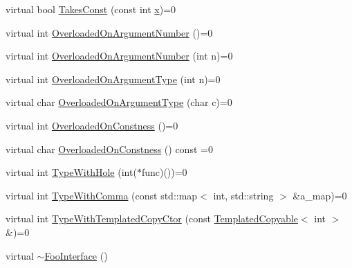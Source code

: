 \begin{DoxyCompactItemize}
\item 
virtual bool \mbox{\hyperlink{classtesting_1_1gmock__function__mocker__test_1_1_foo_interface_abb43737fd2eeb7599b6f0af540890f50}{Takes\+Const}} (const int \mbox{\hyperlink{_obj__test_2lib_2googletest-master_2googlemock_2test_2gmock-matchers__test_8cc_a6150e0515f7202e2fb518f7206ed97dc}{x}})=0
\item 
virtual int \mbox{\hyperlink{classtesting_1_1gmock__function__mocker__test_1_1_foo_interface_ae27d00da9698493b196d0913dd5b6c1a}{Overloaded\+On\+Argument\+Number}} ()=0
\item 
virtual int \mbox{\hyperlink{classtesting_1_1gmock__function__mocker__test_1_1_foo_interface_abc3dde10866e94084cdf5b3b412d2274}{Overloaded\+On\+Argument\+Number}} (int n)=0
\item 
virtual int \mbox{\hyperlink{classtesting_1_1gmock__function__mocker__test_1_1_foo_interface_a78fc84ae56ba53a36047f0791d03fc58}{Overloaded\+On\+Argument\+Type}} (int n)=0
\item 
virtual char \mbox{\hyperlink{classtesting_1_1gmock__function__mocker__test_1_1_foo_interface_ae45c3906c2196a0978720b91c521f91f}{Overloaded\+On\+Argument\+Type}} (char c)=0
\item 
virtual int \mbox{\hyperlink{classtesting_1_1gmock__function__mocker__test_1_1_foo_interface_a94e43dbddc176d1702a7a7d7281f2642}{Overloaded\+On\+Constness}} ()=0
\item 
virtual char \mbox{\hyperlink{classtesting_1_1gmock__function__mocker__test_1_1_foo_interface_a9014d2f6527f719b718b0915b27ff5c5}{Overloaded\+On\+Constness}} () const =0
\item 
virtual int \mbox{\hyperlink{classtesting_1_1gmock__function__mocker__test_1_1_foo_interface_aa14850645cd7a5462480f1717df5153c}{Type\+With\+Hole}} (int($\ast$func)())=0
\item 
virtual int \mbox{\hyperlink{classtesting_1_1gmock__function__mocker__test_1_1_foo_interface_af1f1d96db798fadbf53fbd886e7c738e}{Type\+With\+Comma}} (const std\+::map$<$ int, std\+::string $>$ \&a\+\_\+map)=0
\item 
virtual int \mbox{\hyperlink{classtesting_1_1gmock__function__mocker__test_1_1_foo_interface_af9e3190c69647229baed1dba41c2fdf8}{Type\+With\+Templated\+Copy\+Ctor}} (const \mbox{\hyperlink{classtesting_1_1gmock__function__mocker__test_1_1_templated_copyable}{Templated\+Copyable}}$<$ int $>$ \&)=0
\item 
virtual \mbox{\hyperlink{classtesting_1_1gmock__function__mocker__test_1_1_foo_interface_a608b0da2acf1fc3c51f56d55a839edc5}{$\sim$\+Foo\+Interface}} ()

\end{DoxyCompactItemize}
